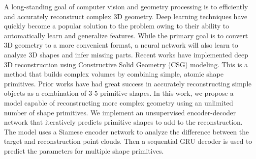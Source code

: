 A long-standing goal of computer vision and geometry processing is to efficiently and accurately reconstruct complex 3D geometry. Deep learning techniques have quickly become a popular solution to the problem owing to their ability to automatically learn and generalize features. While the primary goal is to convert 3D geometry to a more convenient format, a neural network will also learn to analyze 3D shapes and infer missing parts. Recent works have implemented deep 3D reconstruction using Constructive Solid Geometry (CSG) modeling. This is a method that builds complex volumes by combining simple, atomic shape primitives. Prior works have had great success in accurately reconstructing simple objects as a combination of 3-5 primitive shapes. In this work, we propose a model capable of reconstructing more complex geometry using an unlimited number of shape primitives. We implement an unsupervised encoder-decoder network that iteratively predicts primitive shapes to add to the reconstruction. The model uses a Siamese encoder network to analyze the difference between the target and reconstruction point clouds. Then a sequential GRU decoder is used to predict the parameters for multiple shape primitives.